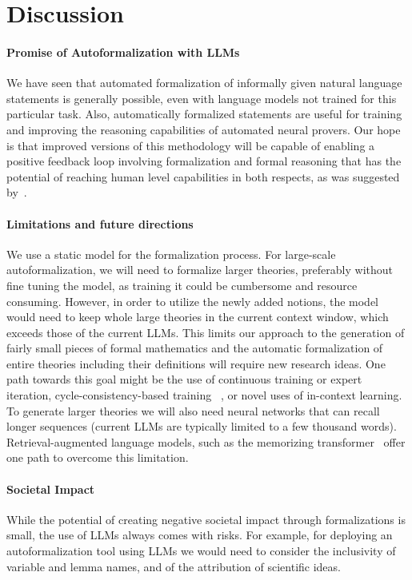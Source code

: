 \documentclass{article}
\begin{document}
\section{Discussion}

\paragraph{Promise of Autoformalization with LLMs} We have seen that automated formalization of informally given natural language statements is generally possible, even with language models not trained for this particular task. Also, automatically formalized statements are useful for training and improving the reasoning capabilities of automated neural provers. Our hope is that improved versions of this methodology will be capable of enabling a positive feedback loop involving formalization and formal reasoning that has the potential of reaching human level capabilities in both respects, as was suggested by~\cite{szegedy2020promisingpath}. 

\paragraph{Limitations and future directions} 
We use a static model for the formalization process. For large-scale autoformalization, we will need to formalize larger theories, preferably without fine tuning the model, as training it could be cumbersome and resource consuming. However, in order to utilize the newly added notions, the model would need to keep whole large theories in the current context window, which  exceeds those of the current LLMs. This limits our approach to the generation of fairly small pieces of formal mathematics and the automatic formalization of entire theories including their definitions will require new research ideas.
One path towards this goal might be the use of continuous training or expert iteration, cycle-consistency-based training ~\citep{lample2017unsupervised,wang2018firsttranslationinformaltoformal}, or novel uses of in-context learning.
To generate larger theories we will also need neural networks that can recall longer sequences (current LLMs are typically limited to a few thousand words). Retrieval-augmented language models, such as the memorizing transformer~\citep{wu2022memorizing} offer one path to overcome this limitation.


\paragraph{Societal Impact}
While the potential of creating negative societal impact through formalizations is small, the use of LLMs always comes with risks. For example, for deploying an autoformalization tool using LLMs we would need to consider the inclusivity of variable and lemma names, and of the attribution of scientific ideas.
 
\end{document}
